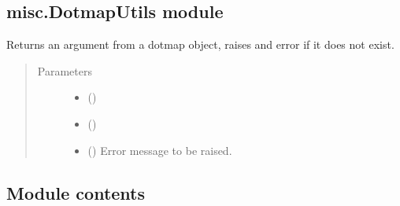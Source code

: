 \documentclass[letterpaper,10pt,english,openany,oneside]{sphinxmanual}
\begin{document}
\subsection{misc.DotmapUtils module}
\label{\detokenize{_modules/misc:module-misc.DotmapUtils}}\label{\detokenize{_modules/misc:misc-dotmaputils-module}}

\begin{fulllineitems}
\label{\detokenize{_modules/misc:misc.DotmapUtils.get_required_argument}}
Returns an argument from a dotmap object, raises and error if it does not exist.
\begin{quote}\begin{description}
\item[{Parameters}] \leavevmode\begin{itemize}
\item {} 
 () \textendash{} 

\item {} 
 () \textendash{} 

\item {} 
 () \textendash{} Error message to be raised.

\end{itemize}

\end{description}\end{quote}

\end{fulllineitems}



\subsection{Module contents}
\label{\detokenize{_modules/misc:module-misc}}\label{\detokenize{_modules/misc:module-contents}}
\end{document}

